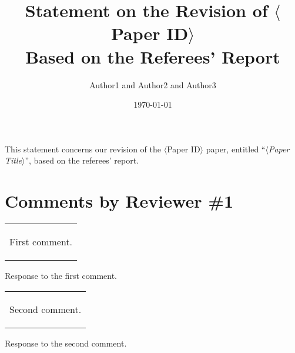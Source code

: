 \documentclass[a4paper,10pt]{article}
\title{Statement on the Revision of $\langle$Paper ID$\rangle$ \\ Based on the Referees' Report}
\author{Author1 and Author2 and Author3}
\date{\today}
\newenvironment{comment}
	{\begin{tabular}{|p{\textwidth}}\begin{tt}}
	{\end{tt}\end{tabular}}
\newenvironment{response}
	{\vspace{0.2cm}}
	{\vspace{0.2cm}}
\begin{document}
\maketitle

\thispagestyle{empty}

This statement concerns our revision of the $\langle$Paper ID$\rangle$ paper,
entitled ``\emph{$\langle$Paper Title$\rangle$}'', based on the referees' report.

\section*{Comments by Reviewer \#1}

\begin{comment}
First comment.
\end{comment}

\begin{response}
Response to the first comment.
\end{response}

\begin{comment}
Second comment.
\end{comment}

\begin{response}
Response to the second comment.
\end{response}
\end{document}
